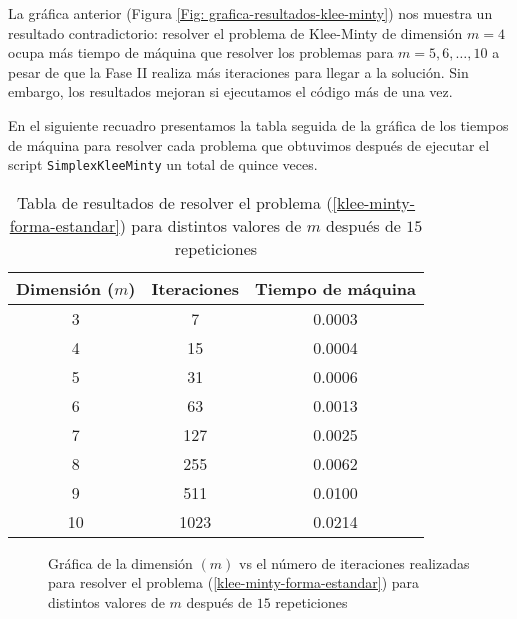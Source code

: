 \documentclass[titlepage]{article}
\begin{document}
 La gráfica anterior (Figura \ref{Fig: grafica-resultados-klee-minty}) nos muestra un resultado contradictorio: resolver el problema de Klee-Minty de dimensión $m = 4$ ocupa más tiempo de máquina que resolver los problemas para $m = 5, 6, \dots, 10$ a pesar de que la Fase II realiza más iteraciones para llegar a la solución. Sin embargo, los resultados mejoran si ejecutamos el código más de una vez.
 
 En el siguiente recuadro presentamos la tabla seguida de la gráfica de los tiempos de máquina para resolver cada problema que obtuvimos después de ejecutar el script \texttt{SimplexKleeMinty} un total de quince veces.

\begin{table}[ht]
    \begin{center}
        \begin{tabular}{|c|c|c|}
            \hline
            \rowcolor[HTML]{C0C0C0} 
            Dimensión ($m$) & Iteraciones    & Tiempo de máquina\\ \hline
            3               & 7              & 0.0003           \\ \hline
            4               & 15             & 0.0004           \\ \hline
            5               & 31             & 0.0006           \\ \hline
            6               & 63             & 0.0013           \\ \hline
            7               & 127            & 0.0025           \\ \hline
            8               & 255            & 0.0062           \\ \hline
            9               & 511            & 0.0100           \\ \hline
            10              & 1023           & 0.0214           \\ \hline
        \end{tabular}
        \caption{Tabla de resultados de resolver el problema (\ref{klee-minty-forma-estandar}) para distintos valores de $m$ después de $15$ repeticiones}
        \label{tabla-resultados-klee-minty-repeticion-15}
    \end{center}
\end{table}

\begin{figure}[ht] 
    \centering
    
    \caption{Gráfica de la dimensión $(m)$ vs el número de iteraciones realizadas para resolver el problema (\ref{klee-minty-forma-estandar}) para distintos valores de $m$ después de $15$ repeticiones}
    \label{Fig: grafica-resultados-klee-minty-repeticion-15}
\end{figure}
\end{document}

